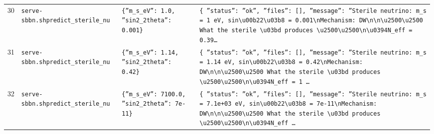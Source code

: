 \documentclass[11pt,a4paper]{article}
\begin{document}
\begin{longtable}{@{}p{}p{}p{}p{}@{}}
30 & \texttt{serve-sbbn.sh}\newline\texttt{predict\_\allowbreak{}sterile\_\allowbreak{}nu} & \texttt{\{''m\_\allowbreak{}s\_\allowbreak{}eV'':\allowbreak{} 1.0,\allowbreak{} ''sin2\_\allowbreak{}2theta'':\allowbreak{} 0.001\}\allowbreak{}} & \texttt{\{   ''status'':\allowbreak{} ''ok'',\allowbreak{}   ''files'':\allowbreak{} []\allowbreak{},\allowbreak{}   ''message'':\allowbreak{} ''Sterile neutrino:\allowbreak{} m\_\allowbreak{}s =\allowbreak{} 1 eV,\allowbreak{} sin\textbackslash{}\allowbreak{}u00b22\textbackslash{}\allowbreak{}u03b8 =\allowbreak{} 0.001\textbackslash{}\allowbreak{}nMechanism:\allowbreak{} DW\textbackslash{}\allowbreak{}n\textbackslash{}\allowbreak{}n\textbackslash{}\allowbreak{}u2500\textbackslash{}\allowbreak{}u2500 What the sterile \textbackslash{}\allowbreak{}u03bd produces \textbackslash{}\allowbreak{}u2500\textbackslash{}\allowbreak{}u2500\textbackslash{}\allowbreak{}n\textbackslash{}\allowbreak{}u0394N\_\allowbreak{}eff =\allowbreak{} 0.39\ldots{}\allowbreak{}} \\
31 & \texttt{serve-sbbn.sh}\newline\texttt{predict\_\allowbreak{}sterile\_\allowbreak{}nu} & \texttt{\{''m\_\allowbreak{}s\_\allowbreak{}eV'':\allowbreak{} 1.14,\allowbreak{} ''sin2\_\allowbreak{}2theta'':\allowbreak{} 0.42\}\allowbreak{}} & \texttt{\{   ''status'':\allowbreak{} ''ok'',\allowbreak{}   ''files'':\allowbreak{} []\allowbreak{},\allowbreak{}   ''message'':\allowbreak{} ''Sterile neutrino:\allowbreak{} m\_\allowbreak{}s =\allowbreak{} 1.14 eV,\allowbreak{} sin\textbackslash{}\allowbreak{}u00b22\textbackslash{}\allowbreak{}u03b8 =\allowbreak{} 0.42\textbackslash{}\allowbreak{}nMechanism:\allowbreak{} DW\textbackslash{}\allowbreak{}n\textbackslash{}\allowbreak{}n\textbackslash{}\allowbreak{}u2500\textbackslash{}\allowbreak{}u2500 What the sterile \textbackslash{}\allowbreak{}u03bd produces \textbackslash{}\allowbreak{}u2500\textbackslash{}\allowbreak{}u2500\textbackslash{}\allowbreak{}n\textbackslash{}\allowbreak{}u0394N\_\allowbreak{}eff =\allowbreak{} 1 \ldots{}\allowbreak{}} \\
32 & \texttt{serve-sbbn.sh}\newline\texttt{predict\_\allowbreak{}sterile\_\allowbreak{}nu} & \texttt{\{''m\_\allowbreak{}s\_\allowbreak{}eV'':\allowbreak{} 7100.0,\allowbreak{} ''sin2\_\allowbreak{}2theta'':\allowbreak{} 7e-11\}\allowbreak{}} & \texttt{\{   ''status'':\allowbreak{} ''ok'',\allowbreak{}   ''files'':\allowbreak{} []\allowbreak{},\allowbreak{}   ''message'':\allowbreak{} ''Sterile neutrino:\allowbreak{} m\_\allowbreak{}s =\allowbreak{} 7.1e+03 eV,\allowbreak{} sin\textbackslash{}\allowbreak{}u00b22\textbackslash{}\allowbreak{}u03b8 =\allowbreak{} 7e-11\textbackslash{}\allowbreak{}nMechanism:\allowbreak{} DW\textbackslash{}\allowbreak{}n\textbackslash{}\allowbreak{}n\textbackslash{}\allowbreak{}u2500\textbackslash{}\allowbreak{}u2500 What the sterile \textbackslash{}\allowbreak{}u03bd produces \textbackslash{}\allowbreak{}u2500\textbackslash{}\allowbreak{}u2500\textbackslash{}\allowbreak{}n\textbackslash{}\allowbreak{}u0394N\_\allowbreak{}eff \ldots{}\allowbreak{}} \\

\end{longtable}
\end{document}
